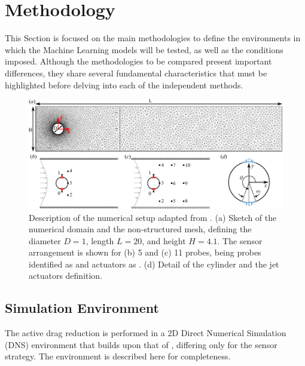 \section{Methodology}\label{s:Methodology}

This Section is focused on the main methodologies to define the environments in which the Machine Learning models will be tested, as well as the conditions imposed. Although the methodologies to be compared present important differences, they share several fundamental characteristics that must be highlighted before delving into each of the independent methods.

\begin{figure}[t]
    \centering
    \includegraphics[width=0.99\linewidth]{Figures/1.pdf}
    \caption{Description of the numerical setup adapted from \citet{rabault2019JFM}. (a) Sketch of the numerical domain and the non-structured mesh, defining the diameter $D=1$, length $L=20$, and height $H=4.1$. The sensor arrangement is shown for (b) 5 and (c) 11 probes, being probes identified as  and actuators as . (d) Detail of the cylinder and the jet actuators definition.}
    \label{fig:NumericalSetup}
\end{figure}

\subsection{Simulation Environment}

The active drag reduction is performed in a 2D Direct Numerical Simulation (DNS) environment that builds upon that of \citet{rabault2019JFM}, differing only for the sensor strategy. The environment is described here for completeness. 

